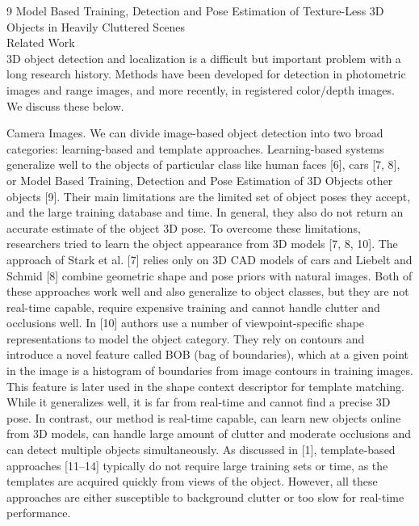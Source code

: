 \documentclass[10]{article}
\begin{document}
9 Model Based Training, Detection and Pose Estimation of Texture-Less 3D Objects in Heavily Cluttered Scenes\\

Related Work\\

3D object detection and localization is a difficult but important problem with a long research history. Methods have been developed for detection in photometric images and range images, and more recently, in registered color/depth images. We discuss these below. 

Camera Images. We can divide image-based object detection into two broad categories: learning-based and template approaches. Learning-based systems generalize well to the objects of particular class like human faces [6], cars [7, 8], or Model Based Training, Detection and Pose Estimation of 3D Objects other objects [9]. Their main limitations are the limited set of object poses they accept, and the large training database and time. In general, they also do not return an accurate estimate of the object 3D pose. To overcome these limitations, researchers tried to learn the object appearance from 3D models [7, 8, 10]. The approach of Stark et al. [7] relies only on 3D CAD models of cars and Liebelt and Schmid [8] combine geometric shape and pose priors with natural images. Both of these approaches work well and also generalize to object classes, but they are not real-time capable, require expensive training and cannot handle clutter and occlusions well. In [10] authors use a number of viewpoint-specific shape representations to model the object category. They rely on contours and introduce a novel feature called BOB (bag of boundaries), which at a given point in the image is a histogram of boundaries from image contours in training images. This feature is later used in the shape context descriptor for template matching. While it generalizes well, it is far from real-time and cannot find a precise 3D pose. In contrast, our method is real-time capable, can learn new objects online from 3D models, can handle large amount of clutter and moderate occlusions and can detect multiple objects simultaneously. As discussed in [1], template-based approaches [11–14] typically do not require large training sets or time, as the templates are acquired quickly from views of the object. However, all these approaches are either susceptible to background clutter or too slow for real-time performance. 
\end{document}
